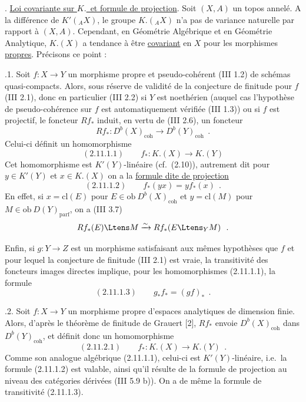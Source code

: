 \medskip

. \underline{Loi covariante sur $K.$\ et formule de projection}. Soit $(X, A)$ un topos annel\'{e}. A la diff\'{e}rence de $K'({}_A X)$, le groupe $K.({}_A X)$ n'a pas de variance naturelle par rapport \`{a} $(X, A)$. Cependant, en G\'{e}om\'{e}trie Alg\'{e}brique et en G\'{e}om\'{e}trie Analytique, $K.(X)$ a tendance \`{a} \^{e}tre \underline{covariant} en $X$ pour les morphismes \underline{propres}. Pr\'{e}cisons ce point :

\medskip

.1. Soit $f : X \longrightarrow Y$ un morphisme propre et pseudo-coh\'{e}rent (III 1.2) de sch\'{e}mas quasi-compacts. Alors, sous r\'{e}serve de validit\'{e} de la conjecture de finitude pour $f$ (III 2.1), donc en particulier (III 2.2) si $Y$ est noeth\'{e}rien (auquel cas l'hypoth\`{e}se de pseudo-coh\'{e}rence sur $f$ est automatiquement v\'{e}rifi\'{e}e (III 1.3)) ou si $f$ est projectif, le foncteur $Rf_*$ induit, en vertu de (III 2.6), un foncteur
\[
Rf_* : D^b(X)_{\mathrm{coh}} \longrightarrow D^b(Y)_{\mathrm{coh}}\ \ .
\]
Celui-ci d\'{e}finit un homomorphisme
\[
\mathrm{(2.11.1.1)} \qquad f_* : K.(X) \longrightarrow K.(Y)
\]
Cet homomorphisme est $K'(Y)$-lin\'{e}aire (cf.\ (2.10)), autrement dit pour $y \in K'(Y)$ et $x \in K.(X)$ on a la \underline{formule dite de projection}
\[
\mathrm{(2.11.1.2)} \qquad f_*(yx) = yf_*(x)\ \ .
\]
En effet, si $x = \mathrm{cl}(E)$ pour $E \in \mathrm{ob}\ D^b(X)_{\mathrm{coh}}$ et $y = \mathrm{cl}(M)$ pour $M \in \mathrm{ob}\ D(Y)_{\mathrm{parf}}$, on a (III 3.7)
\[
Rf_*(E) \Ltens M \xrightarrow{\sim} Rf_*(E \Ltens_Y M)\ \ .
\]

Enfin, si $g : Y \longrightarrow Z$ est un morphisme satisfaisant aux m\^{e}mes hypoth\`{e}ses que $f$ et pour lequel la conjecture de finitude (III 2.1) est vraie, la transitivit\'{e} des foncteurs images directes implique, pour les homomorphismes (2.11.1.1), la formule
\[
\mathrm{(2.11.1.3)} \qquad g_*f_* = (gf)_*\ \ .
\]

.2. Soit $f : X \longrightarrow Y$ un morphisme propre d'espaces analytiques de dimension finie. Alors, d'apr\`{e}s le th\'{e}or\`{e}me de finitude de Grauert [2], $Rf_*$ envoie $D^b(X)_{\mathrm{coh}}$ dans $D^b(Y)_{\mathrm{coh}}$, et d\'{e}finit donc un homomorphisme
\[
\mathrm{(2.11.2.1)} \qquad f_* : K.(X) \longrightarrow K.(Y)\ \ .
\]
Comme son analogue alg\'{e}brique (2.11.1.1), celui-ci est $K'(Y)$-lin\'{e}aire, i.e.\ la formule (2.11.1.2) est valable, ainsi qu'il r\'{e}sulte de la formule de projection au niveau des cat\'{e}gories d\'{e}riv\'{e}es (III 5.9 b)). On a de m\^{e}me la formule de transitivit\'{e} (2.11.1.3).


